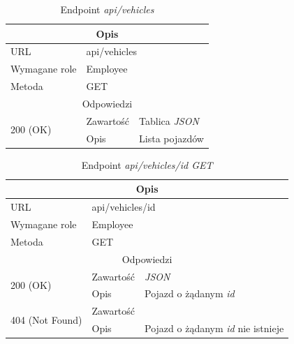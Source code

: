 \documentclass[eng,printmode,openany]{mgr}
\begin{document}
\newpage
\begin{table}[H]
	\caption{Endpoint \textit{api/vehicles}}
	\begin{tabularx}{\textwidth}{|l|l|X|}
		\hline
		\multicolumn{3}{|c|}{Opis}
		\\ \hline
		URL                         & \multicolumn{2}{l|}{api/vehicles}
		\\ \hline
		Wymagane role               & \multicolumn{2}{l|}{Employee}
		\\ \hline
		Metoda                      & \multicolumn{2}{l|}{GET}
		\\ \hline
		\multicolumn{3}{|c|}{ Odpowiedzi}
		\\ \hline
		\multirow{2}{*}{200 (OK)}   & Zawartość         & Tablica \textit{JSON}
		\\ \cline{2-3}              & Opis         	    & Lista pojazdów
		\\ \hline
	\end{tabularx}
\end{table}

\begin{table}[H]
	\caption{Endpoint \textit{api/vehicles/id GET}}
	\begin{tabularx}{\textwidth}{|l|l|X|}
		\hline
		\multicolumn{3}{|c|}{Opis}
		\\ \hline
		URL                         & \multicolumn{2}{l|}{api/vehicles/id}
		\\ \hline
		Wymagane role               & \multicolumn{2}{l|}{Employee}
		\\ \hline
		Metoda                      & \multicolumn{2}{l|}{GET}
		\\ \hline
		\multicolumn{3}{|c|}{Odpowiedzi}
		\\ \hline
		\multirow{2}{*}{200 (OK)} 	        & Zawartość   	& \textit{JSON}
		\\ \cline{2-3}                      & Opis         	& Pojazd o żądanym \textit{id}
		\\ \hline
		\multirow{2}{*}{404 (Not Found)} 	& Zawartość     & 
		\\ \cline{2-3}                      & Opis          & Pojazd o żądanym \textit{id} nie istnieje
		\\ \hline
	\end{tabularx}
\end{table}
\end{document}
